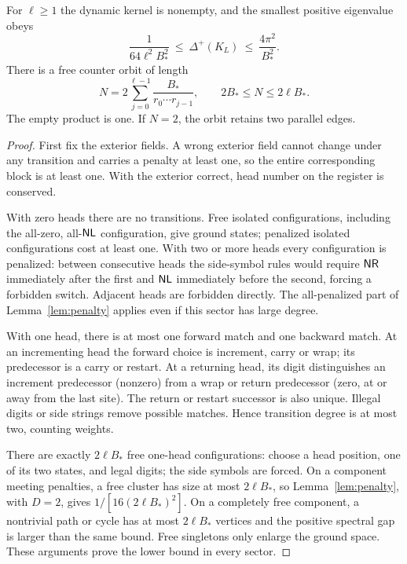\begin{lemma}\label{lem:counter}
For $\ell\geq1$ the dynamic kernel is nonempty, and the smallest positive
eigenvalue obeys
\begin{equation}\label{eq:countergap}
 \frac{1}{64\ell^2 B_*^2}\ \leq\ \Delta^+(K_L)
 \ \leq\ \frac{4\pi^2}{B_*^2}.
\end{equation}
There is a free counter orbit of length
\begin{equation}\label{eq:orbit}
 N=2\sum_{j=0}^{\ell-1}\frac{B_*}{r_0\cdots r_{j-1}},
 \qquad 2B_*\leq N\leq2\ell B_*.
\end{equation}
The empty product is one. If $N=2$, the orbit retains two parallel edges.
\end{lemma}
\begin{proof}
First fix the exterior fields. A wrong exterior field cannot change under
any transition and carries a penalty at least one, so the entire
corresponding block is at least one. With the exterior correct, head number
on the register is conserved.

With zero heads there are no transitions. Free isolated configurations,
including the all-zero, all-$\mathsf{NL}$ configuration, give ground states;
penalized isolated configurations cost at least one. With two or more
heads every configuration is penalized: between consecutive heads the
side-symbol rules would require $\mathsf{NR}$ immediately after the first and
$\mathsf{NL}$ immediately before the second, forcing a forbidden switch.
Adjacent heads are forbidden directly. The all-penalized part of
Lemma~\ref{lem:penalty} applies even if this sector has large degree.

With one head, there is at most one forward match and one backward match.
At an incrementing head the forward choice is increment, carry or wrap;
its predecessor is a carry or restart. At a returning head, its digit
distinguishes an increment predecessor (nonzero) from a wrap or return
predecessor (zero, at or away from the last site). The return or restart
successor is also unique. Illegal digits or side strings remove possible
matches. Hence transition degree is at most two, counting weights.

There are exactly $2\ell B_*$ free one-head configurations: choose a head
position, one of its two states, and legal digits; the side symbols are
forced. On a component meeting penalties, a free cluster has size at most
$2\ell B_*$, so Lemma~\ref{lem:penalty}, with $D=2$, gives
$1/[16(2\ell B_*)^2]$. On a completely free component, a nontrivial
path or cycle has at most $2\ell B_*$ vertices and the positive spectral
gap is larger than the same bound. Free singletons only enlarge the
ground space. These arguments prove the lower bound in every sector.


\end{proof}
